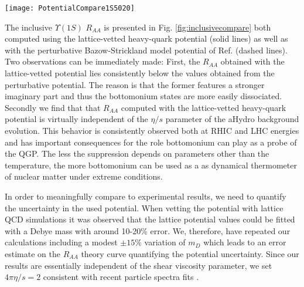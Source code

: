 \begin{figure*}[h]
\centerline{
\texttt{[image: PotentialCompare1S5020]}
}
\caption{
(Color online) bottomonium suppression for the LHC run2 parameter set based on the perturbative model of \cite{Strickland:2009ft} (top three curves) and the lattice-vetted heavy-quark potential (bottom three curves).
Note that due to the large imaginary part in the lattice-vetted potential the suppression is consistently larger in than in the perturbative model potential. Interestingly we find that virtually no dependence on the chosen values for the shear viscosity to entropy ratio is observed with the lattice-vetted potential. This behavior is found both at RHIC and LHC energies.
}
\label{fig:inclusivecompare}
\end{figure*}

The inclusive $\Upsilon(1S)$ $R_{AA}$ is presented in Fig. \ref{fig:inclusivecompare} both computed using the lattice-vetted heavy-quark potential (solid lines) as well as with the perturbative Bazow-Strickland model potential of Ref.\cite{Strickland:2011aa} (dashed lines). Two observations can be immediately made: First, the $R_{AA}$ obtained with the lattice-vetted potential lies consistently below the values obtained from the perturbative potential. The reason is that the former features a stronger imaginary part and thus the bottomonium states are more easily dissociated. Secondly we find that that $R_{AA}$ computed with the lattice-vetted heavy-quark potential is virtually independent of the $\eta/s$ parameter of the aHydro background evolution. This behavior is consistently observed both at RHIC and LHC energies and has important consequences for the role bottomonium can play as a probe of the QGP. The less the suppression depends on parameters other than the temperature, the more bottomonium can be used as a as dynamical thermometer of nuclear matter under extreme conditions.

In order to meaningfully compare to experimental results, we need to quantify the uncertainty in the used potential. When vetting the potential with lattice QCD simulations it was observed that the lattice potential values could be fitted with a Debye mass with around 10-20\% error. We, therefore, have repeated our calculations including a modest $\pm 15\%$ variation of $m_{D}$ which leads to an error estimate on the $R_{AA}$ theory curve quantifying the potential uncertainty. Since our results are essentially independent of the shear viscosity parameter, we set $4\pi\eta/s=2$ consistent with recent particle spectra fits \cite{Alqahtani:2017jwl}. 

